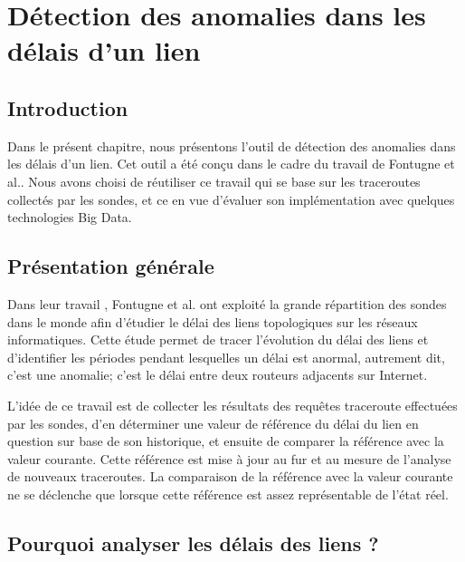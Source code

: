 \chapter{Détection des anomalies dans les délais d'un lien}\label{chap:algorith-detection}

\section{Introduction}
Dans le présent chapitre, nous présentons l'outil de détection des anomalies dans les délais d'un lien. Cet outil a été  conçu dans le cadre du travail \cite{DBLP:journals/corr/FontugneAPB16}  de  Fontugne et al.. Nous avons choisi de réutiliser ce travail qui se base sur les traceroutes collectés par les sondes, et ce en vue d'évaluer son implémentation avec quelques technologies  Big Data.  

\section{Présentation générale}

Dans leur travail \cite{DBLP:journals/corr/FontugneAPB16}, Fontugne et al. ont exploité la grande répartition  des sondes  dans le monde afin d'étudier le délai des liens topologiques sur les réseaux informatiques. Cette étude permet  de tracer l'évolution du délai des liens et d'identifier les périodes pendant lesquelles un délai est anormal, autrement dit, c'est une anomalie; c'est le délai entre deux routeurs adjacents sur Internet.

L'idée de ce travail est de collecter les résultats des requêtes traceroute effectuées par les sondes, d'en déterminer une valeur de référence du délai du lien en question sur base de  son historique, et ensuite de comparer la référence avec la valeur courante.  Cette référence est mise à jour au fur et au mesure de l'analyse de nouveaux traceroutes. 
La comparaison de la référence avec la valeur courante ne se déclenche que lorsque cette  référence est assez représentable de l'état réel.%


\section{Pourquoi analyser les délais des liens  ?}

